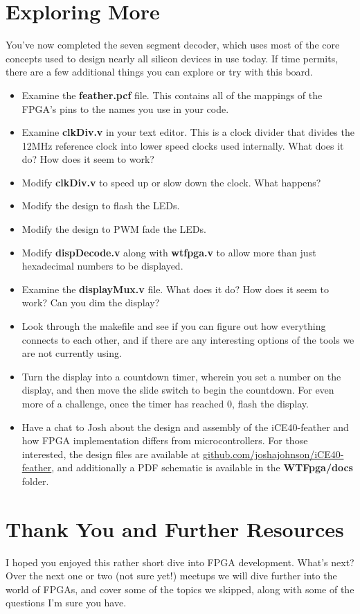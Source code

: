 \documentclass[12pt,a4paper]{article}
\begin{document}
\newpage
\section{Exploring More}
You've now completed the seven segment decoder, which uses most of the core concepts used to design nearly all silicon devices in use today. If time permits, there are a few additional things you can explore or try with this board. 
\begin{itemize}
	\item Examine the \textbf{feather.pcf} file. This contains all of the mappings of the FPGA's pins to the names you use in your code. 
	\item Examine \textbf{clkDiv.v} in your text editor. This is a clock divider that divides the 12MHz reference clock into lower speed clocks used internally. What does it do? How does it seem to work?
	\item Modify \textbf{clkDiv.v} to speed up or slow down the clock. What happens? 
	\item Modify the design to flash the LEDs.
	\item Modify the design to PWM fade the LEDs. 
	\item Modify \textbf{dispDecode.v} along with \textbf{wtfpga.v} to allow more than just hexadecimal numbers to be displayed.
	\item Examine the \textbf{displayMux.v} file. What does it do? How does it seem to work? Can you dim the display? 
	\item Look through the makefile and see if you can figure out how everything connects to each other, and if there are any interesting options of the tools we are not currently using.
	\item Turn the display into a countdown timer, wherein you set a number on the display, and then move the slide switch to begin the countdown. For even more of a challenge, once the timer has reached 0, flash the display.
	\item Have a chat to Josh about the design and assembly of the iCE40-feather and how FPGA implementation differs from microcontrollers. For those interested, the design files are available at \url{github.com/joshajohnson/iCE40-feather}, and additionally a PDF schematic is available in the \textbf{WTFpga/docs} folder.
\end{itemize}

\newpage
\section{Thank You and Further Resources}
I hoped you enjoyed this rather short dive into FPGA development. What's next? Over the next one or two (not sure yet!) meetups we will dive further into the world of FPGAs, and cover some of the topics we skipped, along with some of the questions I'm sure you have. \\
\end{document}
